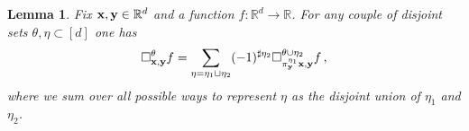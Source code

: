 \documentclass[12pt]{article}
\numberwithin{equation}{section}
\theoremstyle{plain}
\newtheorem{lemma}[theorem]{Lemma}
\theoremstyle{definition}
\newcommand{\R}{\ensuremath{{\mathbb R}}}
\def\fy{\mathbf y}\def\fz{\mathbf z}
\begin{document}
%

\begin{lemma}\label{lem:shiftSquareIncrements}
    Fix $\fx,\fy\in\R^d$ and a function $f:\R^d\to\R$. For any couple of disjoint sets  $\theta,\eta\subset[d]$  one has
    \begin{equation}
        \square_{\fx,\fy}^{\theta} f = \sum_{\eta = \eta_1\sqcup\eta_2} (-1)^{\sharp{\eta_2}} \square^{\theta\cup\eta_2}_{\pi^{\eta_1}_\fy \fx, \fy}f\,,
    \end{equation}
     where we sum over all possible ways to represent $\eta$ as the disjoint union of $\eta_1$ and $\eta_2$.
\end{lemma}
\end{document}
